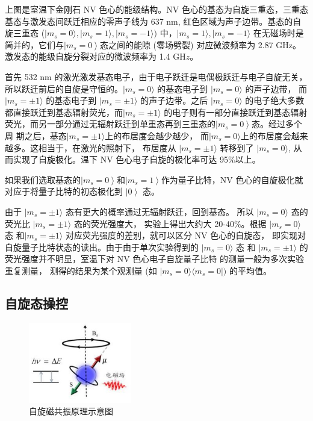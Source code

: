 \documentclass[a4paper,UTF8]{ctexart}
\begin{document}
上图是室温下金刚石 NV 色心的能级结构。NV 色心的基态为自旋三重态，三重态基态与激发态间跃迁相应的零声子线为 637 nm, 红色区域为声子边带。基态的自旋三重态 ($|m_s=0\rangle,|m_s=1\rangle,|m_s=-1\rangle)$ 中，$|m_s=1\rangle,|m_s=-1\rangle$ 在无磁场时是简并的，它们与$\left|m_s=0\right\rangle$态之间的能隙 (零场劈裂) 对应微波频率为 2.87 GHz。激发态的能级自旋分裂对应的微波频率为 1.4 GH$z$。

首先 532 nm 的激光激发基态电子，由于电子跃迁是电偶极跃迁与电子自旋无关，所以跃迁前后的自旋是守恒的。$|m_s=0\rangle$ 的基态电子到 $|m_s=0\rangle$ 的声子边带， 而 $|m_s=\pm1\rangle$ 的基态电子到 $|m_s=\pm1\rangle$ 的声子边带。之后 $|m_s=0\rangle$ 的电子绝大多数都直接跃迁到基态辐射荧光，而$|m_s=\pm1\rangle$ 的电子则有一部分直接跃迁到基态辐射荧光，而另一部分通过无辐射跃迁到单重态再到三重态的$\left|m_s=0\right>$态。经过多个周
期之后，基态$|m_s=\pm1\rangle$上的布居度会越少越少，
而$|m_s=0\rangle$上的布居度会越来越多。这相当于，在激光的照射下，
布居度从 $|m_s=\pm1\rangle$ 转移到了 $|m_s=0\rangle$, 
从而实现了自旋极化。温下 NV 色心电子自旋的极化率可达 95$\%$以上。

如果我们选取基态的$\left|m_s=0\right\rangle$和$\left|m_s=1\right>$作为量子比特，NV 色心的自旋极化就对应于将量子比特的初态极化到 $\left|0\right>$ 态。

由于 $|m_s=\pm1\rangle$ 态有更大的概率通过无辐射跃迁，回到基态。
所以 $|m_s=0\rangle$ 态的荧光比 $|m_s=\pm1\rangle$ 态的荧光强度大，
实验上得出大约大 20-40$\%$。根据 $|m_s=0\rangle$ 态
和$|m_s=\pm1\rangle$ 对应荧光强度的差别，就可以区分 NV 色心的自旋态，
即实现对自旋量子比特状态的读出。由于由于单次实验得到的 $|m_s=0\rangle$ 态
和 $|m_s=\pm1\rangle$ 的荧光强度并不明显，室温下对 NV 色心电子自旋量子比特
的测量一般为多次实验重复测量， 测得的结果为某个观测量 
(如 $|m_s=0\rangle\langle m_s=0|)$ 的平均值。

\subsection{自旋态操控}

\begin{figure}[H]
    \centering
    \begin{minipage}[b]{0.9\textwidth}
        \centering
        \includegraphics[width=0.4\textwidth]{./fig6.jpg}
        \caption{自旋磁共振原理示意图}
    \end{minipage}
\end{figure}
\end{document}
